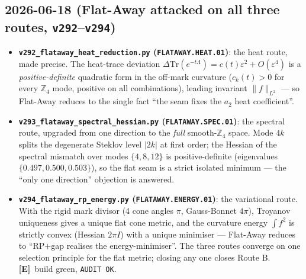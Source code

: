 \documentclass[11pt]{article}
\providecommand{\mE}{\textbf{[E]}}\providecommand{\mC}{\textbf{[C]}}
\begin{document}
\subsection*{2026-06-18 (Flat-Away attacked on all three routes, \texttt{v292}--\texttt{v294})}
\begin{itemize}
\item \textbf{\texttt{v292\_flataway\_heat\_reduction.py} (\texttt{FLATAWAY.HEAT.01})}: the heat route, made
  precise. The heat-trace deviation $\Delta\mathrm{Tr}(e^{-t\Lambda})=c(t)\varepsilon^2+O(\varepsilon^4)$ is a
  \emph{positive-definite} quadratic form in the off-mark curvature ($c_k(t)>0$ for every $\mathbb{Z}_4$ mode,
  positive on all combinations), leading invariant $\|f\|_{L^2}$ --- so Flat-Away reduces to the single fact
  ``the seam fixes the $a_2$ heat coefficient''.
\item \textbf{\texttt{v293\_flataway\_spectral\_hessian.py} (\texttt{FLATAWAY.SPEC.01})}: the spectral route,
  upgraded from one direction to the \emph{full} smooth-$\mathbb{Z}_4$ space. Mode $4k$ splits the degenerate
  Steklov level $|2k|$ at first order; the Hessian of the spectral mismatch over modes $\{4,8,12\}$ is
  positive-definite (eigenvalues $\{0.497,0.500,0.503\}$), so the flat seam is a strict isolated minimum --- the
  ``only one direction'' objection is answered.
\item \textbf{\texttt{v294\_flataway\_rp\_energy.py} (\texttt{FLATAWAY.ENERGY.01})}: the variational route. With
  the rigid mark divisor (4 cone angles $\pi$, Gauss-Bonnet $4\pi$), Troyanov uniqueness gives a unique flat
  cone metric, and the curvature energy $\int f^2$ is strictly convex (Hessian $2\pi I$) with a unique
  minimiser --- Flat-Away reduces to ``RP$+$gap realises the energy-minimiser''. The three routes converge on
  one selection principle for the flat metric; closing any one closes Route B. \mE\ build green,
  \texttt{AUDIT OK}.
\end{itemize}
\end{document}
